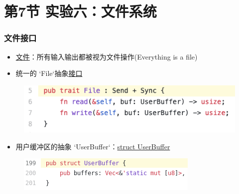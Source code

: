 \section{第7节 实验六：文件系统}%
% 
% 
\begin{frame}
	\frametitle{文件接口}
% 
		\begin{itemize}
		\item \href{https://rcore-os.github.io/rCore-Tutorial-Book-v3/chapter6/1file-descriptor.html\#id3}{文件}：所有输入输出都被视为文件操作(Everything is a file)
		\item 统一的 `File`抽象\href{https://github.com/rcore-os/rCore-Tutorial-v3/blob/ch6/os/src/fs/mod.rs\#L5}{接口}
		\end{itemize}
    \begin{figure}
        \centering
        \includegraphics[width=0.6\linewidth]{lecture04/figs/mod-L5.png}
    \end{figure}
% 
% 
		\begin{itemize}
		\item 用户缓冲区的抽象 `UserBuffer`：\href{https://github.com/rcore-os/rCore-Tutorial-v3/blob/ch6/os/src/mm/page_table.rs\#L199}{struct UserBuffer}
		\end{itemize}
    \begin{figure}
        \centering
        \includegraphics[width=0.6\linewidth]{figs/page_table-L199.png}
    \end{figure}
% 
% 
\end{frame}
